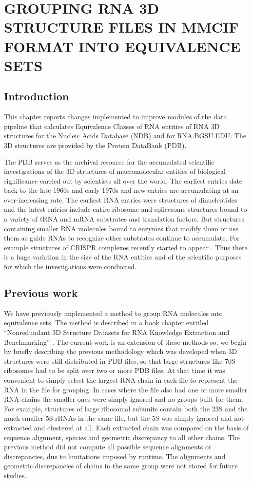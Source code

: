 \chapter{GROUPING RNA 3D STRUCTURE FILES IN MMCIF FORMAT INTO EQUIVALENCE SETS}

\section{Introduction}

This chapter reports changes implemented to improve modules of the data pipeline
that calculates Equivalence Classes of RNA entities of RNA 3D structures for the
Nucleic Acids Database (NDB) and for RNA.BGSU.EDU. The 3D structures are
provided by the Protein DataBank (PDB).

The PDB serves as the archival resource for the accumulated scientific
investigations of the 3D structures of macromolecular entities of biological
significance carried out by scientists all over the world. The earliest entries
date back to the late 1960s and early 1970s and new entries are accumulating at
an ever-increasing rate. The earliest RNA entries were structures of
dinucleotides and the latest entries include entire ribosome and splicesome
structures bound to a variety of tRNA and mRNA substrates and translation
factors. But structures containing smaller RNA molecules bound to enzymes that
modify them or use them as guide RNAs  to recognize other substrates continue to
accumulate. For example structures of CRISPR complexes recently started to
appear \cite{Wang2015, Nunez2015}. Thus there is a huge variation in the size of
the RNA entities and of the scientific purposes for which the investigations
were conducted.

\section{Previous work}

We have previously implemented a method to group RNA molecules into equivalence
sets. The method is described in a book chapter entitled ``Nonredundant 3D
Structure Datasets for RNA Knowledge Extraction and Benchmarking''
\cite{Leontis2012b}. The current work is an extension of these methods so, we
begin by briefly describing the previous methodology which was developed when 3D
structures were still distributed in PDB files, so that large structures like
70S ribosomes had to be split over two or more PDB files. At that time it was
convenient to simply select the largest RNA chain in each file to represent the
RNA in the file for grouping. In cases where the file also had one or more
smaller RNA chains the smaller ones were simply ignored and no groups built for
them. For example, structures of large ribosomal subunits contain both the 23S
and the much smaller 5S rRNAs in the same file, but the 5S was simply ignored
and not extracted and clustered at all. Each extracted chain was compared on the
basis of sequence alignment, species and geometric discrepancy to all other
chains. The previous method did not compute all possible sequence alignments or
discrepancies, due to limitations imposed by runtime. The alignments and
geometric discrepancies of chains in the same group were not stored for future
studies.

